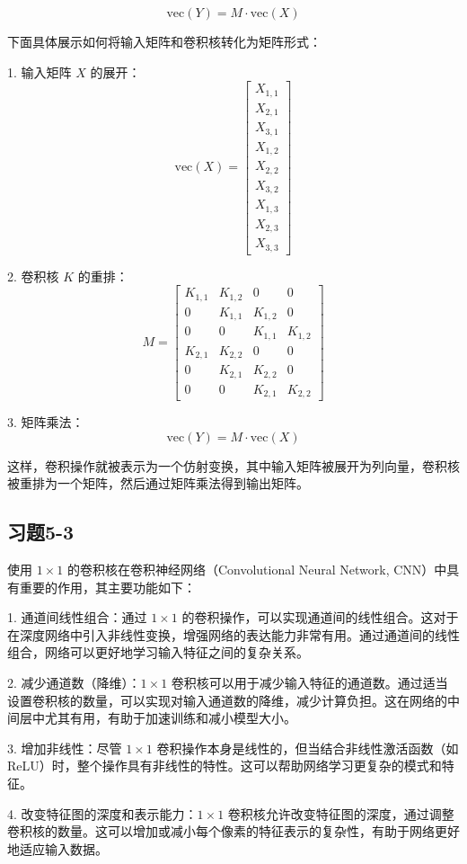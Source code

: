 \documentclass[]{article}
\begin{document}
\[ \text{vec}(Y) = M \cdot \text{vec}(X) \]

下面具体展示如何将输入矩阵和卷积核转化为矩阵形式：

1. 输入矩阵 \(X\) 的展开：
\[ \text{vec}(X) = \begin{bmatrix} X_{1,1} \\ X_{2,1} \\ X_{3,1} \\ X_{1,2} \\ X_{2,2} \\ X_{3,2} \\ X_{1,3} \\ X_{2,3} \\ X_{3,3} \end{bmatrix} \]

2. 卷积核 \(K\) 的重排：
\[ M = \begin{bmatrix} K_{1,1} & K_{1,2} & 0 & 0 \\ 0 & K_{1,1} & K_{1,2} & 0 \\ 0 & 0 & K_{1,1} & K_{1,2} \\ K_{2,1} & K_{2,2} & 0 & 0 \\ 0 & K_{2,1} & K_{2,2} & 0 \\ 0 & 0 & K_{2,1} & K_{2,2} \end{bmatrix} \]

3. 矩阵乘法：
\[ \text{vec}(Y) = M \cdot \text{vec}(X) \]

这样，卷积操作就被表示为一个仿射变换，其中输入矩阵被展开为列向量，卷积核被重排为一个矩阵，然后通过矩阵乘法得到输出矩阵。
\subsection{习题5-3}
使用 $1 \times 1$ 的卷积核在卷积神经网络（Convolutional Neural Network, CNN）中具有重要的作用，其主要功能如下：

1. 通道间线性组合：通过 $1 \times 1$ 的卷积操作，可以实现通道间的线性组合。这对于在深度网络中引入非线性变换，增强网络的表达能力非常有用。通过通道间的线性组合，网络可以更好地学习输入特征之间的复杂关系。

2. 减少通道数（降维）：$1 \times 1$ 卷积核可以用于减少输入特征的通道数。通过适当设置卷积核的数量，可以实现对输入通道数的降维，减少计算负担。这在网络的中间层中尤其有用，有助于加速训练和减小模型大小。

3. 增加非线性：尽管 $1 \times 1$ 卷积操作本身是线性的，但当结合非线性激活函数（如ReLU）时，整个操作具有非线性的特性。这可以帮助网络学习更复杂的模式和特征。

4. 改变特征图的深度和表示能力：$1 \times 1$ 卷积核允许改变特征图的深度，通过调整卷积核的数量。这可以增加或减小每个像素的特征表示的复杂性，有助于网络更好地适应输入数据。
\end{document}

